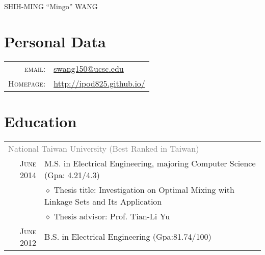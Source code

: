 \documentclass[a4paper,10pt]{article}
\begin{document}
\pagestyle{empty} %

\par{\centering
		{\Huge SHIH-MING ``Mingo'' WANG
	}\bigskip\par}

\section{Personal Data}

\begin{tabular}{rl}
    \textsc{email:}     & \href{mailto:swang150@ucsc.edu}{swang150@ucsc.edu}\\
\textsc{Homepage:} & \href{http://ipod825.github.io/}{http://ipod825.github.io/}
    
\end{tabular}

\section{Education}
\begin{tabular}{r|l}	
\multicolumn{2}{l}{\textcolor{gray}{National Taiwan University (Best Ranked in Taiwan)}}\\
\textsc{June 2014}          & M.S. in Electrical Engineering, majoring Computer Science (Gpa: 4.21/4.3)\\
                            & $\diamond$ Thesis title: Investigation on Optimal Mixing with Linkage Sets and Its Application\\
                            & $\diamond$ Thesis advisor: Prof. Tian-Li Yu\\
\textsc{June 2012}          & B.S. in Electrical Engineering (Gpa:81.74/100)\\       
\end{tabular}
\end{document}
